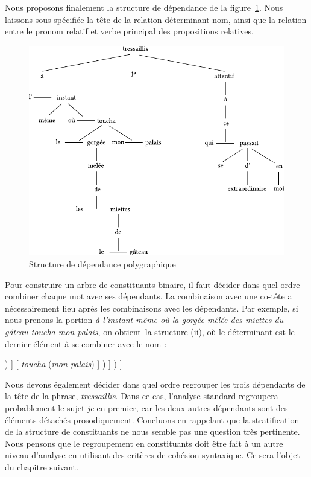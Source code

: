 {    Nous proposons finalement la structure de dépendance de la figure~\ref{fig:proust}. Nous laissons sous-spécifiée la tête de la relation déterminant-nom, ainsi que la relation entre le pronom relatif et verbe principal des propositions relatives.
    
    \begin{figure}[H]
    \includegraphics[scale=.9]{figures/polygraphs/poly-3.4.31.pdf}
    \caption{Structure de dépendance polygraphique\label{fig:proust}}
    \end{figure}
    
    Pour construire un arbre de constituants binaire, il faut décider dans quel ordre combiner chaque mot avec ses dépendants. La combinaison avec une co-tête a nécessairement lieu après les combinaisons avec les dépendants. Par exemple, si nous prenons la portion \textit{à l’instant même où la gorgée mêlée des miettes du gâteau toucha mon palais}, on obtient~la structure (ii), où le déterminant est le dernier élément à se combiner avec le nom :
    
    \begin{exe}
    \relax
        [ \textit{à} ( \textit{l’} [ (\textit{instant même}) ( \textit{où} [ \textit{la} (\textit{gorgée} [\textit{mêlée des miettes du gâteau}] ) ] [ \textit{toucha} (\textit{mon palais}) ] ) ] ) ]
    \end{exe}\tcbbreak
    \noindent Nous devons également décider dans quel ordre regrouper les trois dépendants de la tête de la phrase, \textit{tressaillis}. Dans ce cas, l’analyse standard regroupera probablement le sujet \textit{je} en premier, car les deux autres dépendants sont des éléments détachés prosodiquement. Concluons en rappelant que la stratification de la structure de constituants ne nous semble pas une question très pertinente. Nous pensons que le regroupement en constituants doit être fait à un autre niveau d’analyse en utilisant des critères de cohésion syntaxique. Ce sera l’objet du chapitre suivant.
 
}
